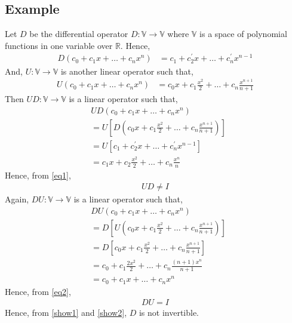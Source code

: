 \documentclass[journal,12pt,twocolumn]{IEEEtran}
\begin{document}
\subsection{Example}
Let $D$ be the differential operator $D:\mathbb{V} \xrightarrow{} \mathbb{V}$ where $\mathbb{V}$ is a space of polynomial functions in one variable over $\mathbb{R}$. Hence,
\begin{align}
D(c_0+c_1x+\dots+c_nx^n) &= c_1+c^{\prime}_2x+\dots+c^{\prime}_nx^{n-1}
\end{align}
And, $U:\mathbb{V} \xrightarrow{} \mathbb{V}$ is another linear operator such that,
\begin{align}
U(c_0+c_1x+\dots+c_nx^n) &= c_0x+c_1\frac{x^2}{2}+\dots+c_n\frac{x^{n+1}}{n+1}
\end{align}
Then $UD:\mathbb{V} \xrightarrow{} \mathbb{V}$ is a linear operator such that,
\begin{align}
&UD(c_0+c_1x+\dots+c_nx^n) \\
&= U[D(c_0x+c_1\frac{x^2}{2}+\dots+c_n\frac{x^{n+1}}{n+1})]\\
&= U[c_1+c^{\prime}_2x+\dots+c^{\prime}_nx^{n-1}]\\
&= c_1x+c_2\frac{x^2}{2}+\dots+c_n\frac{x^{n}}{n}\label{eq1}\
\end{align}
Hence, from \eqref{eq1},
\begin{align}
UD \ne I\label{show1}
\end{align}
Again, $DU:\mathbb{V} \xrightarrow{} \mathbb{V}$ is a linear operator such that,
\begin{align}
&DU(c_0+c_1x+\dots+c_nx^n) \\
&= D[U(c_0x+c_1\frac{x^2}{2}+\dots+c_n\frac{x^{n+1}}{n+1})]\\
&= D[c_0x+c_1\frac{x^2}{2}+\dots+c_n\frac{x^{n+1}}{n+1}]\\
&= c_0+c_1\frac{2x^2}{2}+\dots+c_n\frac{(n+1)x^{n}}{n+1}\\
&= c_0+c_1x+\dots+c_nx^n\label{eq2}
\end{align}
Hence, from \eqref{eq2},
\begin{align}
DU = I\label{show2}
\end{align}
Hence, from \eqref{show1} and \eqref{show2}, $D$ is not invertible.
\end{document}
